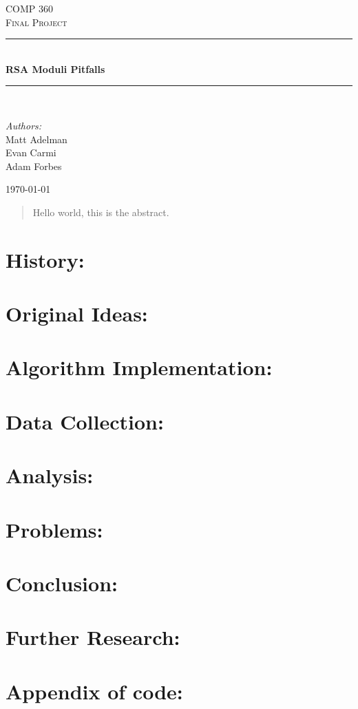 \documentclass[12pt]{article}
\newcommand{\HRule}{\rule{\linewidth}{0.5mm}}
\begin{document}
\begin{titlepage}

\begin{center}
\textsc{\LARGE COMP 360}\\[1.5cm]
\textsc{\Large Final Project}\\[0.5cm]
\HRule \\[0.4cm]
{ \huge \bfseries RSA Moduli Pitfalls}\\[0.4cm]
\HRule \\[1.5cm]
\begin{minipage}{0.4\textwidth}
\begin{center} \large
\emph{Authors:}\\
Matt Adelman\\Evan Carmi\\Adam Forbes
\end{center}
\end{minipage}
\vfill
{\large \today}
\end{center}
\end{titlepage}

\tableofcontents

\newpage

\begin{@twocolumnfalse}

\begin{abstract}
  Hello world, this is the abstract.
\end{abstract}
\end{@twocolumnfalse}


\section{History:}

\section{Original Ideas:}

\section{Algorithm Implementation:}

\section{Data Collection:}

\section{Analysis:}

\section{Problems:}

\section{Conclusion:}

\section{Further Research:}

\appendix
\section{Appendix of code:}
\end{document}
